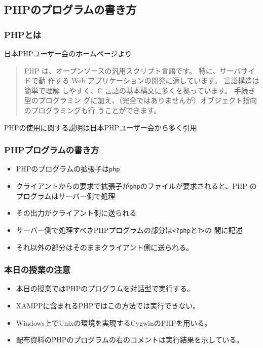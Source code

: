 \subsection{PHPのプログラムの書き方}
\begin{frame}[containsverbatim]
\frametitle{PHPとは}
日本PHPユーザー会のホームページより

\begin{quotation}
PHP は、オープンソースの汎用スクリプト言語です。 特に、サーバサイドで動
 作する Web アプリケーションの開発に適しています。 言語構造は簡単で理解
 しやすく、C 言語の基本構文に多くを拠っています。 手続き型のプログラミン
 グに加え、（完全ではありませんが）オブジェクト指向のプログラミングも行
 うことができます。
\end{quotation}
PHPの使用に関する説明は日本PHPユーザー会から多く引用
\end{frame}
\begin{frame}[containsverbatim]
\frametitle{PHPプログラムの書き方}
\begin{itemize}
 \item PHPのプログラムの拡張子は\texttt{php}
 \item クライアントからの要求で拡張子が\texttt{php}のファイルが要求されると、PHP
のプログラムはサーバー側で処理
 \item その出力がクライアント側に送られる
 \item サーバー側で処理すべきPHPプログラムの部分は\texttt{<?php}と\texttt{?>}の
間に記述
 \item それ以外の部分はそのままクライアント側に送られる。
\end{itemize}
\end{frame}
\begin{frame}[containsverbatim]
 \frametitle{本日の授業の注意}
 \begin{itemize}
  \item 本日の授業ではPHPのプログラムを対話型で実行する。
  \item XAMPPに含まれるPHPではこの方法では実行できない。
  \item Windows上でUnixの環境を実現するCygwinのPHPを用いる。
  \item 配布資料のPHPのプログラムの右のコメントは実行結果を示している。
 \end{itemize}
\end{frame}
